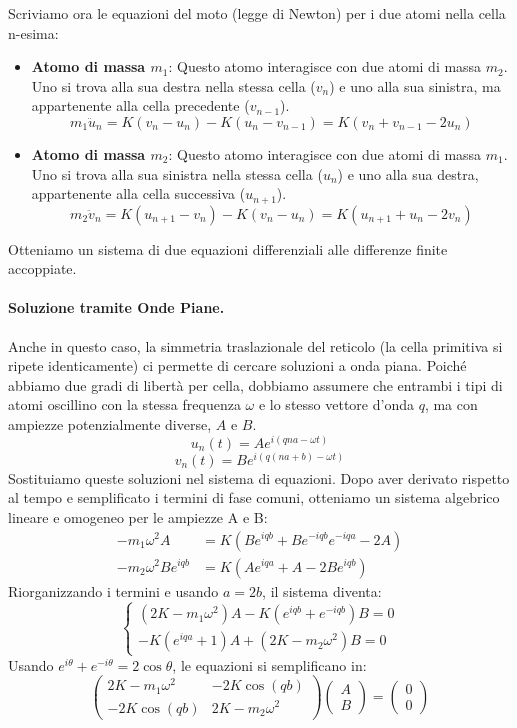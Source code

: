 Scriviamo ora le equazioni del moto (legge di Newton) per i due atomi nella cella n-esima:
\begin{itemize}
    \item \textbf{Atomo di massa \(m_1\)}: Questo atomo interagisce con due atomi di massa \(m_2\). Uno si trova alla sua destra nella stessa cella (\(v_n\)) e uno alla sua sinistra, ma appartenente alla cella precedente (\(v_{n-1}\)).
    \[ m_1 \ddot{u}_n = K(v_n - u_n) - K(u_n - v_{n-1}) = K(v_n + v_{n-1} - 2u_n) \]
    \item \textbf{Atomo di massa \(m_2\)}: Questo atomo interagisce con due atomi di massa \(m_1\). Uno si trova alla sua sinistra nella stessa cella (\(u_n\)) e uno alla sua destra, appartenente alla cella successiva (\(u_{n+1}\)).
    \[ m_2 \ddot{v}_n = K(u_{n+1} - v_n) - K(v_n - u_n) = K(u_{n+1} + u_n - 2v_n) \]
\end{itemize}
Otteniamo un sistema di due equazioni differenziali alle differenze finite accoppiate.

\paragraph{Soluzione tramite Onde Piane.}
Anche in questo caso, la simmetria traslazionale del reticolo (la cella primitiva si ripete identicamente) ci permette di cercare soluzioni a onda piana. Poiché abbiamo due gradi di libertà per cella, dobbiamo assumere che entrambi i tipi di atomi oscillino con la stessa frequenza \(\omega\) e lo stesso vettore d'onda \(q\), ma con ampiezze potenzialmente diverse, \(A\) e \(B\).
\[ u_n(t) = A e^{i(qna - \omega t)} \]
\[ v_n(t) = B e^{i(q(na+b) - \omega t)} \]
Sostituiamo queste soluzioni nel sistema di equazioni. Dopo aver derivato rispetto al tempo e semplificato i termini di fase comuni, otteniamo un sistema algebrico lineare e omogeneo per le ampiezze A e B:
\begin{align*}
-m_1 \omega^2 A &= K(B e^{iqb} + B e^{-iqb}e^{-iqa} - 2A) \\
-m_2 \omega^2 B e^{iqb} &= K(A e^{iqa} + A - 2B e^{iqb})
\end{align*}
Riorganizzando i termini e usando \(a=2b\), il sistema diventa:
\[ \begin{cases} (2K - m_1 \omega^2)A - K(e^{iqb} + e^{-iqb})B = 0 \\ -K(e^{iqa} + 1)A + (2K - m_2 \omega^2)B = 0 \end{cases} \]
Usando \(e^{i\theta} + e^{-i\theta} = 2\cos\theta\), le equazioni si semplificano in:
\[ \begin{pmatrix} 2K - m_1 \omega^2 & -2K\cos(qb) \\ -2K\cos(qb) & 2K - m_2 \omega^2 \end{pmatrix} \begin{pmatrix} A \\ B \end{pmatrix} = \begin{pmatrix} 0 \\ 0 \end{pmatrix} \]

